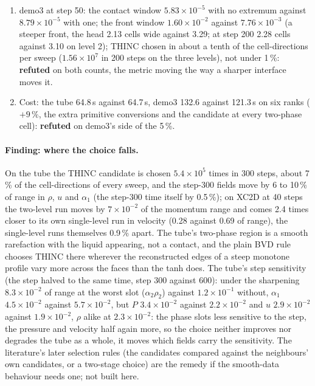 \documentclass[11pt,a4paper]{article}
\begin{document}
\begin{enumerate}[nosep]
      $9.73\times10^{-8}$, both at the gate's $10^{-6}$; the tube's
      vacuum folds 0 under both: \textbf{held}.
\item demo3 at step 50: the contact window $5.83\times10^{-5}$ with no
      extremum against $8.79\times10^{-5}$ with one; the front window
      $1.60\times10^{-2}$ against $7.76\times10^{-3}$ (a steeper front,
      the head 2.13 cells wide against 3.29; at step 200 2.28 cells against 3.10 on level 2);
      THINC chosen in about a tenth of the cell-directions per sweep
      ($1.56\times10^{7}$ in 200 steps on the three levels), not under
      1\,\%: \textbf{refuted} on both counts, the metric moving the way
      a sharper interface moves it.
\item Cost: the tube 64.8\,s against 64.7\,s, demo3 132.6 against
      121.3\,s on six ranks ($+9\,\%$, the extra primitive conversions
      and the candidate at every two-phase cell): \textbf{refuted} on
      demo3's side of the 5\,\%.
\end{enumerate}

\paragraph{Finding: where the choice falls.}  On the tube the THINC
candidate is chosen $5.4\times10^{5}$ times in 300 steps, about 7\,\% of
the cell-directions of every sweep, and the step-300 fields move by 6 to
10\,\% of range in $\rho$, $u$ and $\alpha_1$ (the step-300 time itself
by 0.5\,\%); on XC2D at 40 steps the two-level run moves by
$7\times10^{-2}$ of the momentum range and comes 2.4 times closer to its
own single-level run in velocity (0.28 against 0.69 of range), the
single-level runs themselves 0.9\,\% apart.  The tube's two-phase
region is a smooth rarefaction with the liquid appearing, not a
contact, and the plain BVD rule chooses THINC there wherever the
reconstructed edges of a steep monotone profile vary more across the
faces than the tanh does.  The tube's step sensitivity (the step halved to the same time, step 300 against 600): under the sharpening $8.3\times10^{-2}$ of range at the worst slot ($\alpha_2\rho_2$) against $1.2\times10^{-1}$ without, $\alpha_1$ $4.5\times10^{-2}$ against $5.7\times10^{-2}$, but $P$ $3.4\times10^{-2}$ against $2.2\times10^{-2}$ and $u$ $2.9\times10^{-2}$ against $1.9\times10^{-2}$, $\rho$ alike at $2.3\times10^{-2}$: the phase slots less sensitive to the step, the pressure and velocity half again more, so the choice neither improves nor degrades the tube as a whole, it moves which fields carry the sensitivity.  The literature's later selection
rules (the candidates compared against the neighbours' own candidates,
or a two-stage choice) are the remedy if the smooth-data behaviour
needs one; not built here.
\end{document}
